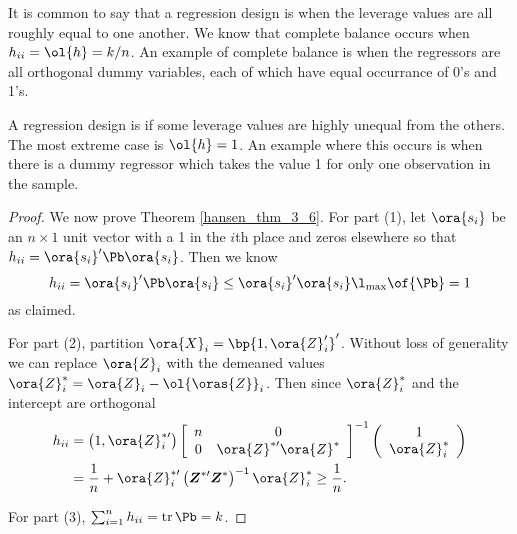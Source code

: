 It is common to say that a regression design is  when the leverage values are all roughly equal to one another. We know that complete balance occurs when $h_{ii} = \ol{h} = k/n$. An example of complete balance is when the regressors are all orthogonal dummy variables, each of which have equal occurrance of 0's and 1's.

A regression design is  if some leverage values are highly unequal from the others. The most extreme case is $\ol{h} = 1$. An example where this occurs is when there is a dummy regressor which takes the value 1 for only one observation in the sample.


\begin{proof}
    We now prove Theorem \ref{hansen_thm_3_6}. For part (1), let $\ora{s_i}$ be an $n \times 1$ unit vector with a 1 in the $i$th place and zeros elsewhere so that $h_{ii} = \ora{s_i}^\prime \Pb \ora{s_i}$. Then we know 
    $$h_{ii} = \ora{s_i}^\prime \Pb \ora{s_i} \leq \ora{s_i}^\prime \ora{s_i} \l_{\text{max}}\of{\Pb} = 1$$
    as claimed.

    For part (2), partition $\ora{X}_i = \bp{1, \ora{Z}_i^\prime}^\prime$. Without loss of generality we can replace $\ora{Z}_i$ with the demeaned values $\ora{Z}_i^* = \ora{Z}_i - \ol{\oras{Z}}_i$. Then since $\ora{Z}_i^*$ and the intercept are orthogonal
    \begin{equation}
        \notag 
        \begin{aligned}
            h_{i i} & =\left(1, \ora{Z}_i^{* \prime}\right)\left[\begin{array}{cc}
            n & 0 \\
            0 & \ora{Z}^{* \prime} \ora{Z}^*
            \end{array}\right]^{-1}\left(\begin{array}{c}
            1 \\
            \ora{Z}_i^*
            \end{array}\right) \\
            & =\frac{1}{n}+\ora{Z}_i^{* \prime}\left(\boldsymbol{Z}^{* \prime} \boldsymbol{Z}^*\right)^{-1} \ora{Z}_i^* \geq \frac{1}{n} .
        \end{aligned}
    \end{equation}

    For part (3), $\sum_{i=1}^{n} h_{ii} = \operatorname*{tr} \Pb = k$.
\end{proof}

